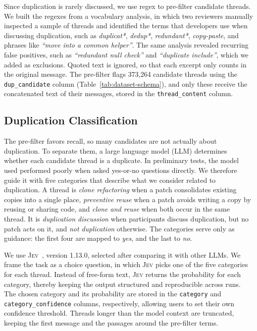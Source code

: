 \documentclass[10pt,conference]{IEEEtran}
\begin{document}
Since duplication is rarely discussed, we use regex to pre-filter candidate threads. We built the regexes from a vocabulary analysis, in which two reviewers manually inspected a sample of threads and identified the terms that developers use when discussing duplication, such as \mbox{\textit{duplicat*}}, \mbox{\textit{dedup*}}, \mbox{\textit{redundant*}}, \mbox{\textit{copy-paste}}, and phrases like \textit{``move into a common helper''}. The same analysis revealed recurring false positives, such as \textit{``redundant null check''} and \textit{``duplicate include''}, which we added as exclusions. Quoted text is ignored, so that each excerpt only counts in the original message. The pre-filter flags 373,264 candidate threads using the \texttt{dup\_candidate} column (Table~\ref{tab:dataset-schema}), and only these receive the concatenated text of their messages, stored in the \texttt{thread\_content} column.

\subsection{Duplication Classification}

The pre-filter favors recall, so many candidates are not actually about duplication. To separate them, a large language model (LLM) determines whether each candidate thread is a duplicate. In preliminary tests, the model used performed poorly when asked yes-or-no questions directly. We therefore guide it with five categories that describe what we consider related to duplication. A thread is \textit{clone refactoring} when a patch consolidates existing copies into a single place, \textit{preventive reuse} when a patch avoids writing a copy by reusing or sharing code, and \textit{clone and reuse} when both occur in the same thread. It is \textit{duplication discussion} when participants discuss duplication, but no patch acts on it, and \textit{not duplication} otherwise. The categories serve only as guidance: the first four are mapped to \textit{yes}, and the last to \textit{no}.

We use \textsc{Jev}~\cite{typesafe_jev}, version 1.13.0, selected after comparing it with other LLMs. We frame the task as a choice question, in which \textsc{Jev} picks one of the five categories for each thread. Instead of free-form text, \textsc{Jev} returns the probability for each category, thereby keeping the output structured and reproducible across runs. The chosen category and its probability are stored in the \texttt{category} and \texttt{category\_confidence} columns, respectively, allowing users to set their own confidence threshold. Threads longer than the model context are truncated, keeping the first message and the passages around the pre-filter terms.
\end{document}
